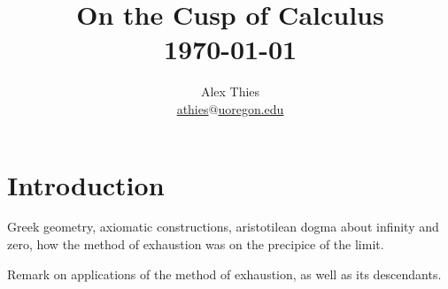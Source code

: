 \documentclass[letterpaper, 12pt]{amsart}
\theoremstyle{definition}  %
\begin{document}
	\title{On the Cusp of Calculus \\ \today}
	\author{Alex Thies \\ \href{mailto:athies@uoregon.edu}{\lowercase{athies$@$uoregon.edu}}}

	\maketitle
	\newpage

	\setcounter{tocdepth}{1}
	\tableofcontents
	\newpage

	\section{Introduction}
	\label{sec:introduction}
	Greek geometry, axiomatic constructions, aristotilean dogma about infinity and zero, how the method of exhaustion was on the precipice of the limit.

	Remark on applications of the method of exhaustion, as well as its descendants.


\end{document}
